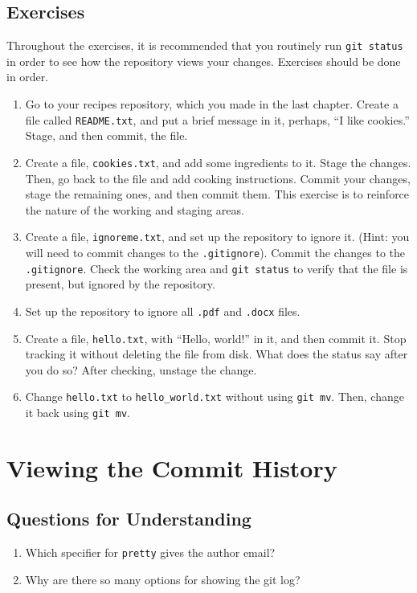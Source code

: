 \subsection{Exercises}
Throughout the exercises, it is recommended that you routinely run
\verb+git status+ in order to see how the repository views your changes.
Exercises should be done in order.
\begin{enumerate}
    \item Go to your recipes repository, which you made in the last chapter.
        Create a file called \verb+README.txt+, and put a brief message in
        it, perhaps, ``I like cookies.'' Stage, and then commit, the file.
    \item Create a file, \verb+cookies.txt+, and add some ingredients to it.
        Stage the changes.
        Then, go back to the file and add cooking instructions.
        Commit your changes, stage the remaining ones, and then commit them.
        This exercise is to reinforce the nature of the working and staging
        areas.
    \item Create a file, \verb+ignoreme.txt+, and set up the repository to
        ignore it.
        (Hint: you will need to commit changes to the \verb+.gitignore+).
        Commit the changes to the \verb+.gitignore+.
        Check the working area and \verb+git status+ to verify that the file
        is present, but ignored by the repository.
    \item Set up the repository to ignore all \verb+.pdf+ and \verb+.docx+ 
        files.
    \item Create a file, \verb+hello.txt+, with ``Hello, world!'' in it,
        and then commit it. Stop tracking it without deleting the file from
        disk.
        What does the status say after you do so?
        After checking, unstage the change.
    \item Change \verb+hello.txt+ to \verb+hello_world.txt+ without using 
        \verb+git mv+.
        Then, change it back using \verb+git mv+.
\end{enumerate}

\section{Viewing the Commit History}

\subsection{Questions for Understanding}
\begin{enumerate}
    \item Which specifier for \verb+pretty+ gives the author email?
    \item Why are there so many options for showing the git log?
\end{enumerate}


